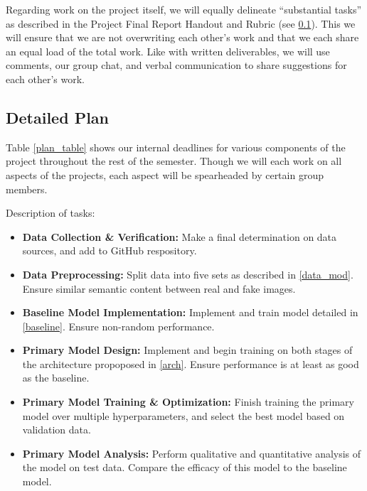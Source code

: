 \documentclass{article} %
\begin{document}
Regarding work on the project itself, we will equally delineate ``substantial tasks'' as described in the Project Final Report Handout and Rubric (see \ref{detailed_plan}). This we will ensure that we are not overwriting each other's work and that we each share an equal load of the total work. Like with written deliverables, we will use comments, our group chat, and verbal communication to share suggestions for each other's work.

\subsection{Detailed Plan}
\label{detailed_plan}

Table \ref{plan_table} shows our internal deadlines for various components of the project throughout the rest of the semester. Though we will each work on all aspects of the projects, each aspect will be spearheaded by certain group members.

Description of tasks:
\begin{itemize}
        \item \textbf{Data Collection \& Verification:} Make a final determination on data sources, and add to GitHub respository.
        \item \textbf{Data Preprocessing:}              Split data into five sets as described in \ref{data_mod}. Ensure similar semantic content between real and fake images. 
        \item \textbf{Baseline Model Implementation:}   Implement and train model detailed in \ref{baseline}. Ensure non-random performance.
        \item \textbf{Primary Model Design:}            Implement and begin training on both stages of the architecture propoposed in \ref{arch}. Ensure performance is at least as good as the baseline.
        \item \textbf{Primary Model Training \& Optimization:} Finish training the primary model over multiple hyperparameters, and select the best model based on validation data.
        \item \textbf{Primary Model Analysis:}          Perform qualitative and quantitative analysis of the model on test data. Compare the efficacy of this model to the baseline model.
\end{itemize}
\end{document}
